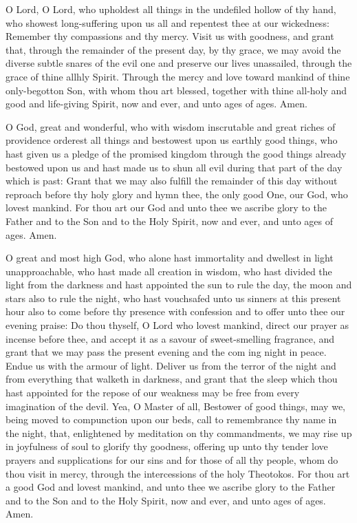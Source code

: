  O Lord, O Lord, who upholdest all things in the undefiled hollow of thy hand, who showest long-suffering upon us all and repentest thee at our wickedness: Remember thy compassions and thy mercy. Visit us with goodness, and grant that, through the remainder of the present day, by thy grace, we may avoid the diverse subtle snares of the evil one and preserve our lives unassailed, through the grace of thine allhly Spirit. Through the mercy and love toward mankind of thine only-begotton Son, with whom thou art blessed, together with thine all-holy and good and life-giving Spirit, now and ever, and unto ages of ages. Amen.

 O God, great and wonderful, who with wisdom inscrutable and great riches of providence orderest all things and bestowest upon us earthly good things, who hast given us a pledge of the promised kingdom through the good things already bestowed upon us and hast made us to shun all evil during that part of the day which is past: Grant that we may also fulfill the remainder of this day without reproach before thy holy glory and hymn thee, the only good One, our God, who lovest mankind. For thou art our God and unto thee we ascribe glory to the Father and to the Son and to the Holy Spirit, now and ever, and unto ages of ages. Amen.

 O great and most high God, who alone hast immortality and dwellest in light unapproachable, who hast made all creation in wisdom, who hast divided the light from the darkness and hast appointed the sun to rule the day, the moon and stars also to rule the night, who hast vouchsafed unto us sinners at this present hour also to come before thy presence with confession and to offer unto thee our evening praise: Do thou thyself, O Lord who lovest mankind, direct our prayer as incense before thee, and accept it as a savour of sweet-smelling fragrance, and grant that we may pass the present evening and the com ing night in peace. Endue us with the armour of light. Deliver us from the terror of the night and from everything that walketh in darkness, and grant that the sleep which thou hast appointed for the repose of our weakness may be free from every imagination of the devil. Yea, O Master of all, Bestower of good things, may we, being moved to compunction upon our beds, call to remembrance thy name in the night, that, enlightened by meditation on thy commandments, we may rise up in joyfulness of soul to glorify thy goodness, offering up unto thy tender love prayers and supplications for our sins and for those of all thy people, whom do thou visit in mercy, through the intercessions of the holy Theotokos. For thou art a good God and lovest mankind, and unto thee we ascribe glory to the Father and to the Son and to the Holy Spirit, now and ever, and unto ages of ages. Amen.

